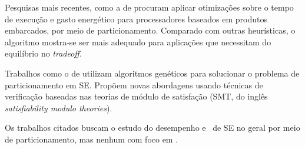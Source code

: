     Pesquisas mais recentes, como a de \cite{BenHajHassine2017} procuram aplicar otimizações sobre o tempo de execução e gasto energético para processadores baseados em produtos embarcados, por meio de particionamento.
    Comparado com outras heurísticas, o algoritmo mostra-se ser mais adequado para aplicações que necessitam do equilíbrio no \textit{tradeoff}.
    
    Trabalhos como o de \cite{Trindade2016} utilizam algoritmos genéticos para solucionar o problema de particionamento em SE.
    Propõem novas abordagens usando técnicas de verificação baseadas nas teorias de módulo de satisfação (SMT, do inglês \textit{satisfiability modulo theories}).
    
    
    Os trabalhos citados buscam o estudo do desempenho e \design\ de SE no geral por meio de particionamento, mas nenhum com foco em \wearables.
    
